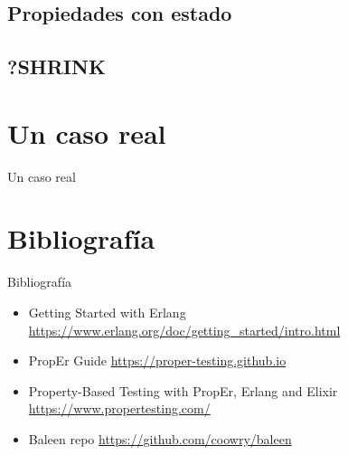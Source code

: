 \documentclass{beamer}
\begin{document}
    \subsection{Propiedades con estado}
    \subsection{?SHRINK}
  \section{Un caso real}
    \begin{frame}{Un caso real}

    \end{frame}
  \section{Bibliografía}
    \begin{frame}{Bibliografía}
      \begin{itemize}
        \item Getting Started with Erlang \url{https://www.erlang.org/doc/getting_started/intro.html}
        \item PropEr Guide \url{https://proper-testing.github.io}
        \item Property-Based Testing with PropEr, Erlang and Elixir \url{https://www.propertesting.com/}
        \item Baleen repo \url{https://github.com/coowry/baleen}
      \end{itemize}
    \end{frame}
\end{document}
